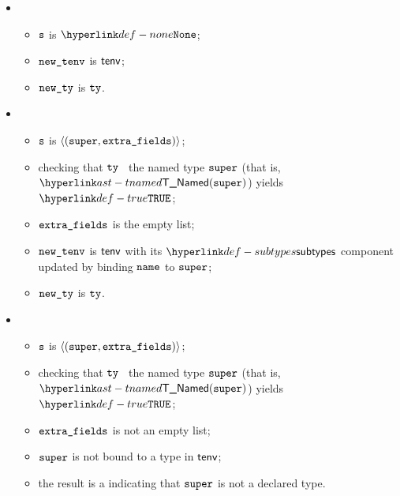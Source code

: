 \ProseParagraph
\OneApplies
\begin{itemize}
  \item {}
  \begin{itemize}
    \item $\texttt{s}$ is $\None$;
    \item $\texttt{new\_tenv}$ is $\textsf{tenv}$;
    \item $\texttt{new\_ty}$ is $\texttt{ty}$.
  \end{itemize}

  \item {}
  \begin{itemize}
    \item $\texttt{s}$ is $\langle(\texttt{super}, \texttt{extra\_fields})\rangle$;
    \item checking that $\texttt{ty}$ \subtypesatisfies\ the named type $\texttt{super}$ (that is, \\ $\TNamed(\vsuper)$) yields
          $\True$\ProseOrTypeError;
    \item $\texttt{extra\_fields}$ is the empty list;
    \item $\texttt{new\_tenv}$ is $\textsf{tenv}$ with its $\subtypes$ component updated by binding $\texttt{name}$ to $\texttt{super}$;
    \item $\texttt{new\_ty}$ is $\texttt{ty}$.
  \end{itemize}

  \item {}
  \begin{itemize}
    \item $\texttt{s}$ is $\langle(\texttt{super}, \texttt{extra\_fields})\rangle$;
    \item checking that $\texttt{ty}$ \subtypesatisfies\ the named type $\texttt{super}$ (that is, \\ $\TNamed(\vsuper)$) yields
          $\True$\ProseOrTypeError;
    \item $\texttt{extra\_fields}$ is not an empty list;
    \item $\texttt{super}$ is not bound to a type in $\textsf{tenv}$;
    \item the result is a \typingerrorterm{} indicating that $\texttt{super}$ is not a declared type.
  \end{itemize}


\end{itemize}
